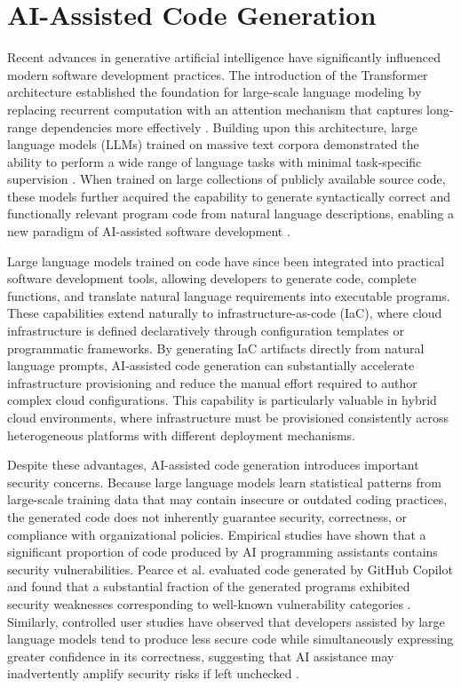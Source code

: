 \section{AI-Assisted Code Generation}
\label{sec:ai_generative}

Recent advances in generative artificial intelligence have significantly influenced modern software development practices. The introduction of the Transformer architecture established the foundation for large-scale language modeling by replacing recurrent computation with an attention mechanism that captures long-range dependencies more effectively \cite{Vaswani2017Attention}. Building upon this architecture, large language models (LLMs) trained on massive text corpora demonstrated the ability to perform a wide range of language tasks with minimal task-specific supervision \cite{Brown2020GPT3}. When trained on large collections of publicly available source code, these models further acquired the capability to generate syntactically correct and functionally relevant program code from natural language descriptions, enabling a new paradigm of AI-assisted software development \cite{Chen2021Codex}.

Large language models trained on code have since been integrated into practical software development tools, allowing developers to generate code, complete functions, and translate natural language requirements into executable programs. These capabilities extend naturally to infrastructure-as-code (IaC), where cloud infrastructure is defined declaratively through configuration templates or programmatic frameworks. By generating IaC artifacts directly from natural language prompts, AI-assisted code generation can substantially accelerate infrastructure provisioning and reduce the manual effort required to author complex cloud configurations. This capability is particularly valuable in hybrid cloud environments, where infrastructure must be provisioned consistently across heterogeneous platforms with different deployment mechanisms.

Despite these advantages, AI-assisted code generation introduces important security concerns. Because large language models learn statistical patterns from large-scale training data that may contain insecure or outdated coding practices, the generated code does not inherently guarantee security, correctness, or compliance with organizational policies. Empirical studies have shown that a significant proportion of code produced by AI programming assistants contains security vulnerabilities. Pearce et al. evaluated code generated by GitHub Copilot and found that a substantial fraction of the generated programs exhibited security weaknesses corresponding to well-known vulnerability categories \cite{Pearce2022Asleep}. Similarly, controlled user studies have observed that developers assisted by large language models tend to produce less secure code while simultaneously expressing greater confidence in its correctness, suggesting that AI assistance may inadvertently amplify security risks if left unchecked \cite{Perry2023Insecure}.

